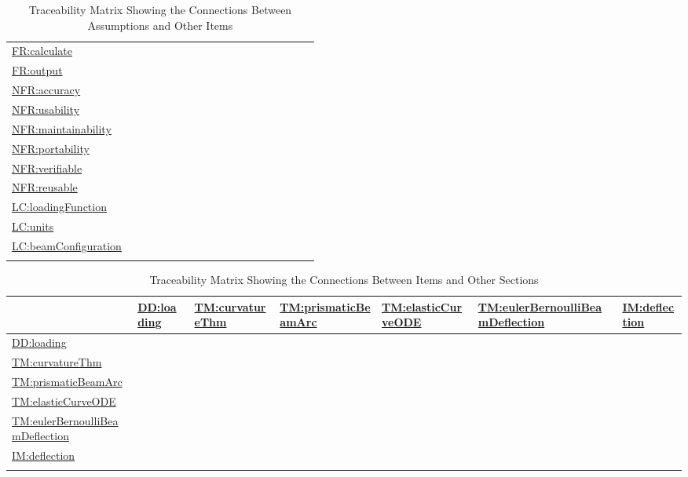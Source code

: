 \documentclass[12pt]{article}
\begin{document}
\begin{longtable}{l l l l l l l l l l l l l l l l l l}
\hyperref[calculate]{FR:calculate} &  &  &  &  &  &  &  &  &  &  &  &  &  &  &  &  & 
\\
\hyperref[output]{FR:output} &  &  &  &  &  &  &  &  &  &  &  &  &  &  &  &  & 
\\
\hyperref[accuracy]{NFR:accuracy} &  &  &  &  &  &  &  &  &  &  &  &  &  &  &  &  & 
\\
\hyperref[usability]{NFR:usability} &  &  &  &  &  &  &  &  &  &  &  &  &  &  &  &  & 
\\
\hyperref[maintainability]{NFR:maintainability} &  &  &  &  &  &  &  &  &  &  &  &  &  &  &  &  & 
\\
\hyperref[portability]{NFR:portability} &  &  &  &  &  &  &  &  &  &  &  &  &  &  &  &  & 
\\
\hyperref[verifiable]{NFR:verifiable} &  &  &  &  &  &  &  &  &  &  &  &  &  &  &  &  & 
\\
\hyperref[reusable]{NFR:reusable} &  &  &  &  &  &  &  &  &  &  &  &  &  &  &  &  & 
\\
\hyperref[loadingFunction]{LC:loadingFunction} &  &  &  &  &  &  &  &  &  &  &  &  &  &  &  &  & 
\\
\hyperref[units]{LC:units} &  &  &  &  &  &  &  &  &  &  &  &  &  &  &  &  & 
\\
\hyperref[beamConfiguration]{LC:beamConfiguration} &  &  &  &  &  &  &  &  &  &  &  &  &  &  &  &  & 
\\
\bottomrule
\caption{Traceability Matrix Showing the Connections Between Assumptions and Other Items}
\label{Table:TraceMatAvsAll}
\end{longtable}
\begin{longtable}{l l l l l l l}
\toprule
\textbf{} & \textbf{\hyperref[DD:loading]{DD:loading}} & \textbf{\hyperref[TM:curvatureThm]{TM:curvatureThm}} & \textbf{\hyperref[TM:prismaticBeamArc]{TM:prismaticBeamArc}} & \textbf{\hyperref[TM:elasticCurveODE]{TM:elasticCurveODE}} & \textbf{\hyperref[TM:eulerBernoulliBeamDeflection]{TM:eulerBernoulliBeamDeflection}} & \textbf{\hyperref[IM:deflection]{IM:deflection}}
\\
\midrule
\endhead
\hyperref[DD:loading]{DD:loading} &  &  &  &  &  & 
\\
\hyperref[TM:curvatureThm]{TM:curvatureThm} &  &  &  &  &  & 
\\
\hyperref[TM:prismaticBeamArc]{TM:prismaticBeamArc} &  &  &  &  &  & 
\\
\hyperref[TM:elasticCurveODE]{TM:elasticCurveODE} &  &  &  &  &  & 
\\
\hyperref[TM:eulerBernoulliBeamDeflection]{TM:eulerBernoulliBeamDeflection} &  &  &  &  &  & 
\\
\hyperref[IM:deflection]{IM:deflection} &  &  &  &  &  & 
\\
\bottomrule
\caption{Traceability Matrix Showing the Connections Between Items and Other Sections}
\label{Table:TraceMatRefvsRef}
\end{longtable}
\end{document}
